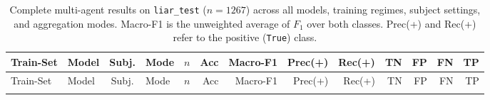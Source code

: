 \begin{landscape}
\scriptsize
\setlength{\tabcolsep}{3pt}
\renewcommand{\arraystretch}{1.05}
\begin{longtable}{@{}l p{3.2cm} c l r r r r r r r r r@{}}
\caption{Complete multi-agent results on \texttt{liar\_test} ($n=1267$) across all models, training regimes, subject settings, and aggregation modes. Macro-F1 is the unweighted average of $F_1$ over both classes. Prec(+) and Rec(+) refer to the positive (\texttt{True}) class.}
\label{tab:multiagent_all_results}\\
\toprule
Train-Set & Model & Subj. & Mode & $n$ & Acc & Macro-F1 & Prec(+) & Rec(+) & TN & FP & FN & TP\\
\midrule
\endfirsthead
\toprule
Train-Set & Model & Subj. & Mode & $n$ & Acc & Macro-F1 & Prec(+) & Rec(+) & TN & FP & FN & TP\\
\midrule
\endhead
\bottomrule
\endfoot


\end{longtable}
\end{landscape}
